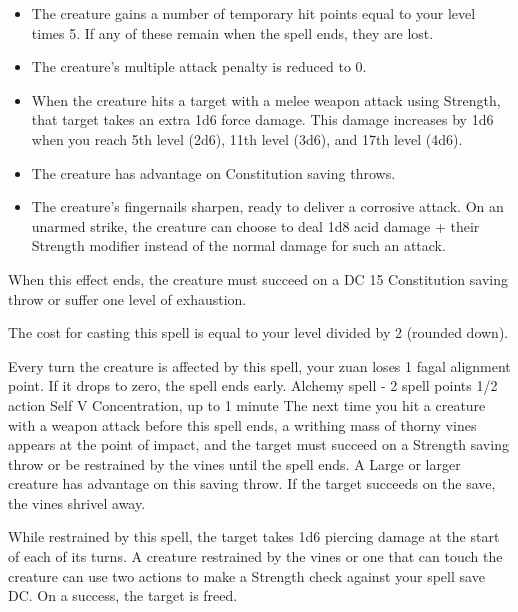         \begin{itemize}
            \item The creature gains a number of temporary hit points equal to your level times 5.
            If any of these remain when the spell ends, they are lost.
            \item The creature's multiple attack penalty is reduced to 0.
            \item When the creature hits a target with a melee weapon attack using Strength, that target takes an extra 1d6 force damage.
            This damage increases by 1d6 when you reach 5th level (2d6), 11th level (3d6), and 17th level (4d6).
            \item The creature has advantage on Constitution saving throws.
            \item The creature's fingernails sharpen, ready to deliver a corrosive attack.
            On an unarmed strike, the creature can choose to deal 1d8 acid damage + their Strength modifier instead of the normal damage for such an attack.
        \end{itemize}

        When this effect ends, the creature must succeed on a DC 15 Constitution saving throw or suffer one level of exhaustion.

        The cost for casting this spell is equal to your level divided by 2 (rounded down).

        Every turn the creature is affected by this spell, your zuan loses 1 fagal alignment point.
        If it drops to zero, the spell ends early.
        {Alchemy spell - 2 spell points}
        {1/2 action}
        {Self}
        {V}
        {Concentration, up to 1 minute}
        The next time you hit a creature with a weapon attack before this spell ends, a writhing mass of thorny vines appears at the point of impact, and the target must succeed on a Strength saving throw or be restrained by the vines until the spell ends.
        A Large or larger creature has advantage on this saving throw.
        If the target succeeds on the save, the vines shrivel away.

        While restrained by this spell, the target takes 1d6 piercing damage at the start of each of its turns.
        A creature restrained by the vines or one that can touch the creature can use two actions to make a Strength check against your spell save DC.
        On a success, the target is freed.

